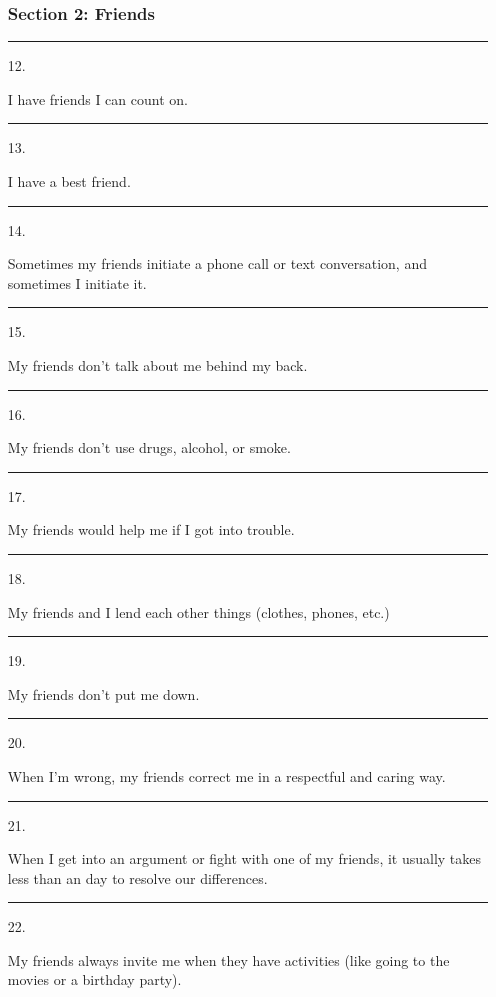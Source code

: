 \documentclass[letterpaper, 12pt]{article}
\begin{document}
\begin{enumerate}
    \subsubsection*{Section 2: Friends}
        \vspace{-.15in}
    \item [\rule{0.3in}{0.01in} 12.] I have friends I can count on. 
    \item [\rule{0.3in}{0.01in} 13.] I have a best friend.
    \item [\rule{0.3in}{0.01in} 14.] Sometimes my friends initiate a phone call or text conversation, and sometimes I initiate it. 
    \item [\rule{0.3in}{0.01in} 15.] My friends don't talk about me behind my back. 
    \item [\rule{0.3in}{0.01in} 16.]My friends don't use drugs, alcohol, or smoke. 
    \item [\rule{0.3in}{0.01in} 17.]My friends would help me if I got into trouble.  
    \item [\rule{0.3in}{0.01in} 18.] My friends and I lend each other things (clothes, phones, etc.)
    \item [\rule{0.3in}{0.01in} 19.] My friends don't put me down. 
    \item [\rule{0.3in}{0.01in} 20.] When I'm wrong, my friends correct me in a respectful and caring way. 
    \item [\rule{0.3in}{0.01in} 21.] When I get into an argument or fight with one of my friends, it usually takes less than an day to resolve our differences.  
    \item [\rule{0.3in}{0.01in} 22.] My friends always invite me when they have activities (like going to the movies or a birthday party).  
    

\end{enumerate}
\end{document}
